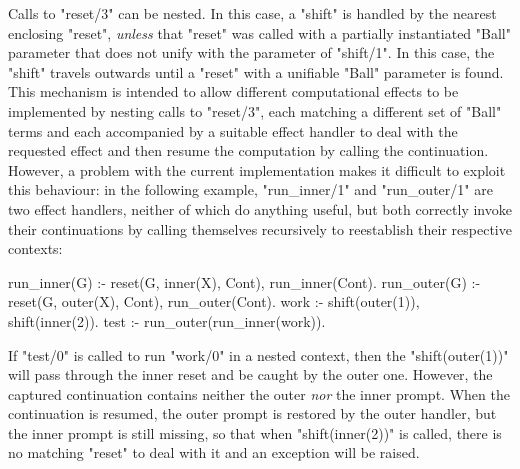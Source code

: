 Calls to "reset/3" can be nested.  In this case, a "shift" is handled by the nearest
enclosing "reset", \emph{unless} that "reset" was called with a partially instantiated "Ball" parameter
that does not unify with the parameter of "shift/1". In this case, the "shift" travels outwards
until a "reset" with a unifiable "Ball" parameter is found. This mechanism is intended to allow different
computational effects to be implemented by nesting calls to "reset/3", each matching a different set of
"Ball" terms and each accompanied by a suitable effect handler to deal with the requested effect and then 
resume the computation by calling the continuation.
However, a problem with the current implementation makes it difficult to exploit this behaviour:
in the following example, "run_inner/1" and "run_outer/1" are two effect handlers, neither of which do
anything useful, but both correctly invoke their continuations by calling themselves recursively
to reestablish their respective contexts:
\begin{prolog-barred}
  run_inner(G) :- reset(G, inner(X), Cont), run_inner(Cont).
  run_outer(G) :- reset(G, outer(X), Cont), run_outer(Cont).
  work :- shift(outer(1)), shift(inner(2)).
  test :- run_outer(run_inner(work)).
\end{prolog-barred}
If "test/0" is called to run "work/0" in a nested context, then the "shift(outer(1))"
will pass through the inner reset and be caught by the outer one. However, the captured
continuation contains neither the outer \emph{nor} the inner prompt. When the continuation is resumed,
the outer prompt is restored by the outer handler, but the inner prompt is still missing, so that
when "shift(inner(2))" is called, there is no matching "reset" to deal with it and an exception will be
raised.

